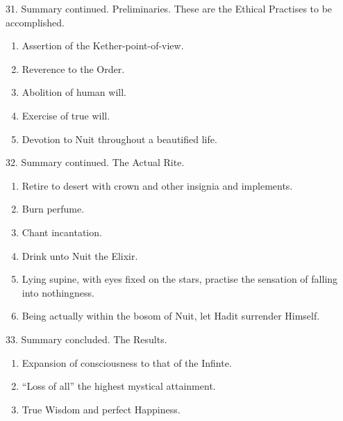 31. Summary continued. Preliminaries. These are the Ethical Practises to be accomplished.
\begin{enumerate}[leftmargin=4\parindent]
\item Assertion of the Kether-point-of-view.
\item Reverence to the Order.
\item Abolition of human will.
\item Exercise of true will.
\item Devotion to Nuit throughout a beautified life.
\end{enumerate}

32. Summary continued. The Actual Rite.
\begin{enumerate}[leftmargin=4\parindent]
\item Retire to desert with crown and other insignia and implements.
\item Burn perfume.
\item Chant incantation.
\item Drink unto Nuit the Elixir.
\item Lying supine, with eyes fixed on the stars, practise the sensation of falling into nothingness.
\item Being actually within the bosom of Nuit, let Hadit surrender Himself.
\end{enumerate}

33. Summary concluded. The Results.
\begin{enumerate}[leftmargin=4\parindent]
\item Expansion of consciousness to that of the Infinte.
\item \enquote{Loss of all} the highest mystical attainment.
\item True Wisdom and perfect Happiness.
\end{enumerate}

